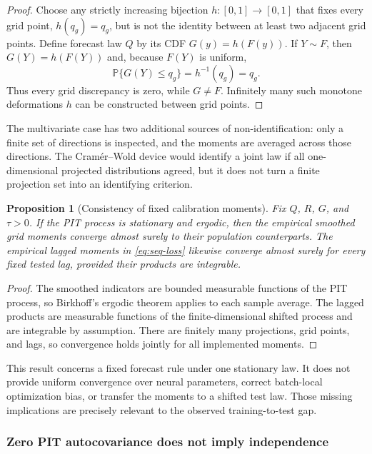 \documentclass[11pt]{article}
\newtheorem{proposition}[definition]{Proposition}
\newcommand{\Pp}{\mathbb{P}}
\begin{document}
\begin{proof}
Choose any strictly increasing bijection $h:[0,1]\to[0,1]$ that fixes every grid
point, $h(q_g)=q_g$, but is not the identity between at least two adjacent grid
points. Define forecast law $Q$ by its CDF $G(y)=h(F(y))$. If $Y\sim F$, then
$G(Y)=h(F(Y))$ and, because $F(Y)$ is uniform,
\[
 \Pp\{G(Y)\leq q_g\}=h^{-1}(q_g)=q_g.
\]
Thus every grid discrepancy is zero, while $G\neq F$. Infinitely many such
monotone deformations $h$ can be constructed between grid points.
\end{proof}

The multivariate case has two additional sources of non-identification: only a
finite set of directions is inspected, and the moments are averaged across those
directions. The Cram\'er--Wold device would identify a joint law if all
one-dimensional projected distributions agreed, but it does not turn a finite
projection set into an identifying criterion.

\begin{proposition}[Consistency of fixed calibration moments]
Fix $Q$, $R$, $G$, and $\tau>0$. If the PIT process is stationary and ergodic,
then the empirical smoothed grid moments converge almost surely to their
population counterparts. The empirical lagged moments in
\eqref{eq:seq-loss} likewise converge almost surely for every fixed tested lag,
provided their products are integrable.
\end{proposition}

\begin{proof}
The smoothed indicators are bounded measurable functions of the PIT process, so
Birkhoff's ergodic theorem applies to each sample average. The lagged products
are measurable functions of the finite-dimensional shifted process and are
integrable by assumption. There are finitely many projections, grid points, and
lags, so convergence holds jointly for all implemented moments.
\end{proof}

This result concerns a fixed forecast rule under one stationary law. It does not
provide uniform convergence over neural parameters, correct batch-local
optimization bias, or transfer the moments to a shifted test law. Those missing
implications are precisely relevant to the observed training-to-test gap.

\subsubsection{Zero PIT autocovariance does not imply independence}
\end{document}
